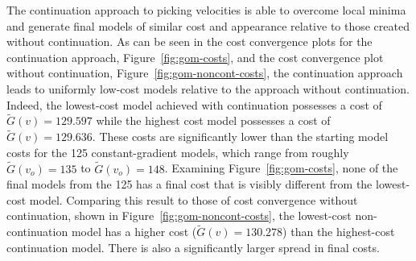 
The continuation approach to picking velocities is able to overcome local minima and generate final models of similar cost and appearance relative to those created without continuation.  As can be seen in the cost convergence plots for the continuation approach, Figure~\ref{fig:gom-costs}, and the cost convergence plot without continuation, Figure~\ref{fig:gom-noncont-costs}, the continuation approach leads to uniformly low-cost models relative to the approach without continuation.  Indeed, the lowest-cost model achieved with continuation possesses a cost of $\tilde{G}(v)=129.597$ while the highest cost model possesses a cost of $\tilde{G}(v)=129.636$.  These costs are significantly lower than the starting model costs for the 125 constant-gradient models, which range from roughly $\tilde{G}(v_o)=135$ to $\tilde{G}(v_o)=148$.  Examining Figure~\ref{fig:gom-costs}, none of the final models from the 125 has a final cost that is visibly different from the lowest-cost model.  Comparing this result to those of cost convergence without continuation, shown in Figure~\ref{fig:gom-noncont-costs}, the lowest-cost non-continuation model has a higher cost ($\tilde{G}(v)=130.278$) than the highest-cost continuation model.  There is also a significantly larger spread in final costs.

